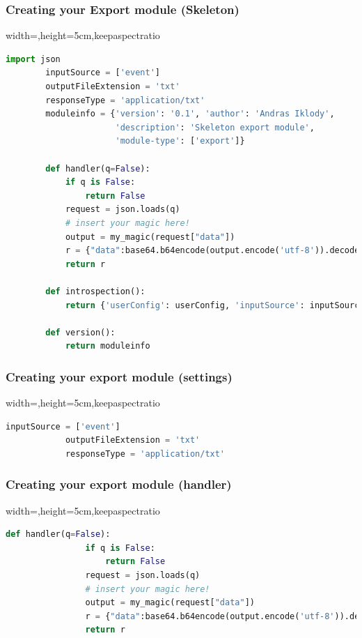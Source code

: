 \begin{frame}[fragile]
      \frametitle{Creating your Export module (Skeleton)}
      \begin{adjustbox}{width=\textwidth,height=5cm,keepaspectratio}
      \begin{lstlisting}[language=python]
        import json
        inputSource = ['event']
        outputFileExtension = 'txt'
        responseType = 'application/txt'
        moduleinfo = {'version': '0.1', 'author': 'Andras Iklody',
                      'description': 'Skeleton export module',
                      'module-type': ['export']}

        def handler(q=False):
            if q is False:
                return False
            request = json.loads(q)
            # insert your magic here!
            output = my_magic(request["data"])
            r = {"data":base64.b64encode(output.encode('utf-8')).decode('utf-8')}
            return r

        def introspection():
            return {'userConfig': userConfig, 'inputSource': inputSource, 'moduleConfig': moduleConfig, 'outputFileExtension': outputFileExtension}

        def version():
            return moduleinfo
              \end{lstlisting}
        \end{adjustbox}
\end{frame}

\begin{frame}[fragile]
    \frametitle{Creating your export module (settings)}
    \begin{adjustbox}{width=\textwidth,height=5cm,keepaspectratio}
        \begin{lstlisting}[language=python]
            inputSource = ['event']
            outputFileExtension = 'txt'
            responseType = 'application/txt'
        \end{lstlisting}
    \end{adjustbox}
\end{frame}

\begin{frame}[fragile]
    \frametitle{Creating your export module (handler)}
    \begin{adjustbox}{width=\textwidth,height=5cm,keepaspectratio}
        \begin{lstlisting}[language=python]
            def handler(q=False):
                if q is False:
                    return False
                request = json.loads(q)
                # insert your magic here!
                output = my_magic(request["data"])
                r = {"data":base64.b64encode(output.encode('utf-8')).decode('utf-8')}
                return r
        \end{lstlisting}
    \end{adjustbox}
\end{frame}

